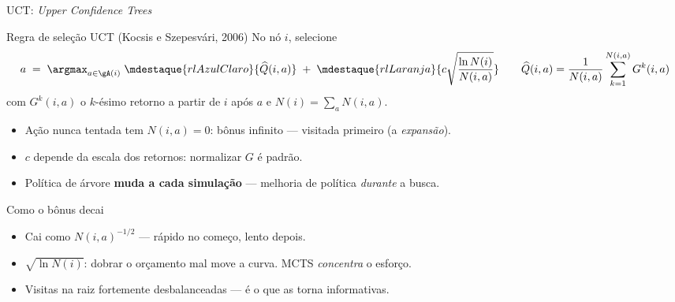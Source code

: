 \documentclass[aspectratio=169, 11pt]{beamer}
\newcommand{\Nv}[1]{N(#1)}                      %
\newcommand{\Qh}{\widehat{Q}}                   %
\newcommand{\ret}{G}                            %
\begin{document}
\begin{frame}{UCT: \emph{Upper Confidence Trees}}
  \begin{teobox}{Regra de seleção UCT (Kocsis e Szepesvári, 2006)}
    No nó $i$, selecione
    \[
      a \;=\; \argmax_{a\in\gA(i)}\;
      \mdestaque{rlAzulClaro}{\Qh(i,a)}
      \;+\;
      \mdestaque{rlLaranja}{c\sqrt{\frac{\ln \Nv{i}}{\Nv{i,a}}}}
      \qquad
      \Qh(i,a) = \frac{1}{\Nv{i,a}}\sum_{k=1}^{\Nv{i,a}} \ret^k(i,a)
    \]
    com $\ret^k(i,a)$ o $k$-ésimo retorno a partir de $i$ após $a$ e
    $\Nv{i}=\sum_a \Nv{i,a}$.
  \end{teobox}

  \pause
  \begin{itemize}\setlength{\itemsep}{0.3ex}
    \item Ação nunca tentada tem $\Nv{i,a}=0$: bônus infinito --- visitada primeiro (a \emph{expansão}).
    \item $c$ depende da escala dos retornos: normalizar $\ret$ é padrão.
    \item Política de árvore \textbf{muda a cada simulação} --- melhoria de política \emph{durante} a busca.
  \end{itemize}
\end{frame}

\begin{frame}{Como o bônus decai}
  \centering

  \vfill
  \raggedright
  \begin{itemize}
    \item Cai como $\Nv{i,a}^{-1/2}$ --- rápido no começo, lento depois.
    \item $\sqrt{\ln \Nv{i}}$: dobrar o orçamento mal move a curva. MCTS \emph{concentra} o esforço.
    \item Visitas na raiz fortemente desbalanceadas --- é o que as torna informativas.
  \end{itemize}
\end{frame}
\end{document}
